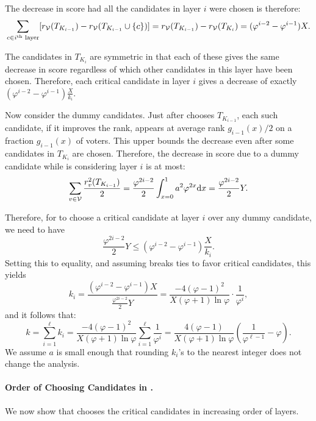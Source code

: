 The decrease in score had all the candidates in layer $i$ were chosen is therefore:
$$\sum_{c \in i^{\text{th}} \text{ layer}} [r_{\mathcal{V}}(T_{K_{i - 1}}) - r_{\mathcal{V}}(T_{K_{i - 1}}\cup \{c\})]= r_{\mathcal{V}}(T_{K_{i - 1}}) - r_{\mathcal{V}}(T_{K_i}) = (\varphi^{i - 2} - \varphi^{i - 1})X.$$

The candidates in $T_{K_i}$ are symmetric in that each of these gives the same decrease in score regardless of which other candidates in this layer have been chosen. Therefore, each critical candidate in layer $i$ gives a decrease of exactly $(\varphi^{i - 2} - \varphi^{i - 1}) \frac{X}{k_i}$.

Now consider the dummy candidates. Just after \g{} chooses $T_{K_{i-1}}$, each such candidate, if it improves the rank, appears at average rank $g_{i-1}(x)/2$ on a fraction $g_{i-1}(x)$ of voters. This upper bounds the decrease even after some candidates in $T_{K_i}$ are chosen. Therefore, the decrease in score due to a dummy candidate while \g{} is considering layer $i$ is at most: 
\[
\sum_{v \in \mathcal{V}}\frac{r_v^2(T_{K_{i-1}})}{2} = \frac{\varphi^{2i-2}}{2}\int_{x = 0}^1 a^2\varphi^{2x} \mathrm{d} x = \frac{\varphi^{2i - 2}}{2} Y.
\]

Therefore, for \g{} to choose a critical candidate at layer $i$ over any dummy candidate, we need to have
\[
\frac{\varphi^{2i - 2}}{2} Y \le (\varphi^{i - 2} - \varphi^{i - 1}) \frac{X}{k_i}.
\]
Setting this to equality, and assuming \g{} breaks ties to favor critical candidates, this yields 
\begin{equation} \label{eq:ki}
k_i = \frac{(\varphi^{i - 2} - \varphi^{i - 1})X}{\frac{\varphi^{2i - 2}}{2}Y} = \frac{-4(\varphi - 1)^2}{X(\varphi + 1)\ln\varphi} \cdot \frac{1}{\varphi^i},
\end{equation}
and it follows that:
\begin{equation}\label{eq:k}
k = \sum_{i = 1}^\ell k_i = \frac{-4(\varphi - 1)^2}{X(\varphi + 1)\ln\varphi} \sum_{i = 1}^\ell \frac{1}{\varphi^i} = \frac{4(\varphi - 1)}{X(\varphi + 1)\ln\varphi} \left(\frac{1}{\varphi^{\ell - 1}} - \varphi \right).
\end{equation}
We assume $a$ is small enough that rounding $k_i$'s to the nearest integer does not change the analysis.

\paragraph{Order of Choosing Candidates in \g{}.} We now show that \g{} chooses the critical candidates in increasing order of layers. 

